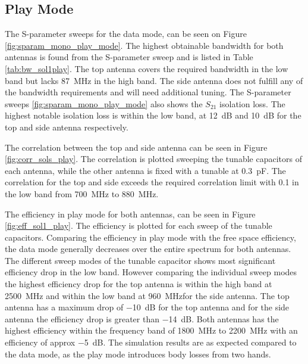\FloatBarrier
\subsection{Play Mode}
The S-parameter sweeps for the data mode, can be seen on Figure \ref{fig:sparam_mono_play_mode}. The highest obtainable bandwidth for both antennas is found from the S-parameter sweep and is listed in Table \ref{tab:bw_sol1play}. The top antenna covers the required bandwidth in the low band but lacks \SI{87}{MHz} in the high band. The side antenna does not fulfill any of the bandwidth requirements and will need additional tuning. The S-parameter sweeps \ref{fig:sparam_mono_play_mode} also shows the $S_{21}$ isolation loss. The highest notable isolation loss is within the low band, at \SI{12}{dB} and \SI{10}{dB} for the top and side antenna respectively.       

The correlation between the top and side antenna can be seen in Figure \ref{fig:corr_sols_play}. The correlation is plotted sweeping the tunable capacitors of each antenna, while the other antenna is fixed with a tunable at \SI{0.3}{pF}. The correlation for the top and side exceeds the required correlation limit with 0.1 in the low band from \SI{700}{MHz} to \SI{880}{MHz}.

The efficiency in play mode for both antennas, can be seen in Figure \ref{fig:eff_sol1_play}. The efficiency is plotted for each sweep of the tunable capacitors. Comparing the efficiency in play mode with the free space efficiency, the data mode generally decreases over the entire spectrum for both antennas. The different sweep modes of the tunable capacitor shows most significant efficiency drop in the low band. However comparing the individual sweep modes the highest efficiency drop for the top antenna is within the high band at \SI{2500}{MHz} and within the low band  at \SI{960}{MHz}for the side antenna. The top antenna has a maximum drop of \SI{-10}{dB} for the top antenna and for the side antenna the efficiency drop is greater than \SI{-14}{dB}.
Both antennas has the highest efficiency within the frequency band of \SI{1800}{MHz} to \SI{2200}{MHz} with an efficiency of approx \SI{-5}{dB}. 
The simulation results are as expected compared to the data mode, as the play mode introduces body losses from two hands. 

